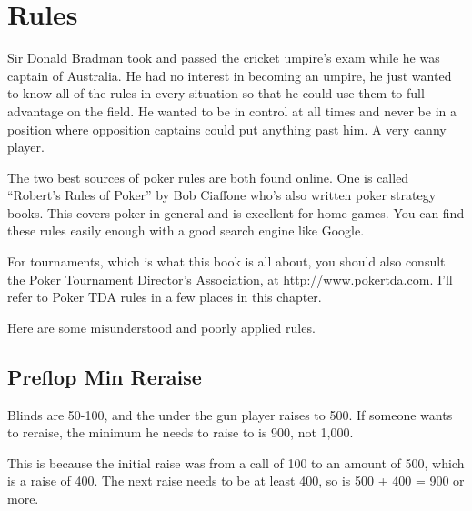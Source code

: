 \chapter{Rules}


Sir Donald Bradman took and passed the cricket umpire's exam while he
was captain of Australia. He had no interest in becoming an
umpire, he just wanted to know all of the rules in
every situation so that he could use them to full advantage
on the field. He wanted to be in control at all times and 
never be in a position where opposition captains could put anything past 
him. A very canny player.

The two best sources of poker rules are both found online.
One is called ``Robert's Rules of Poker'' by Bob Ciaffone
who's also written poker strategy books. This covers
poker in general and is excellent for home games. You
can find these rules easily enough with a good 
search engine like Google.

For tournaments, which is what this book is all about,
you should also consult the Poker Tournament Director's Association,
at http://www.pokertda.com. 
I'll refer to Poker TDA rules in a few places in this chapter.



Here are some misunderstood and poorly applied rules.

\section{Preflop Min Reraise}

Blinds are 50-100, and the under the gun player
raises to 500. If someone wants to reraise, the minimum
he needs to raise to is 900, not 1,000. 

This is because the initial raise was from a call of 100 to an
amount of 500, which is a raise of 400. The next raise needs
to be at least 400, so is 500 + 400 = 900 or more.

